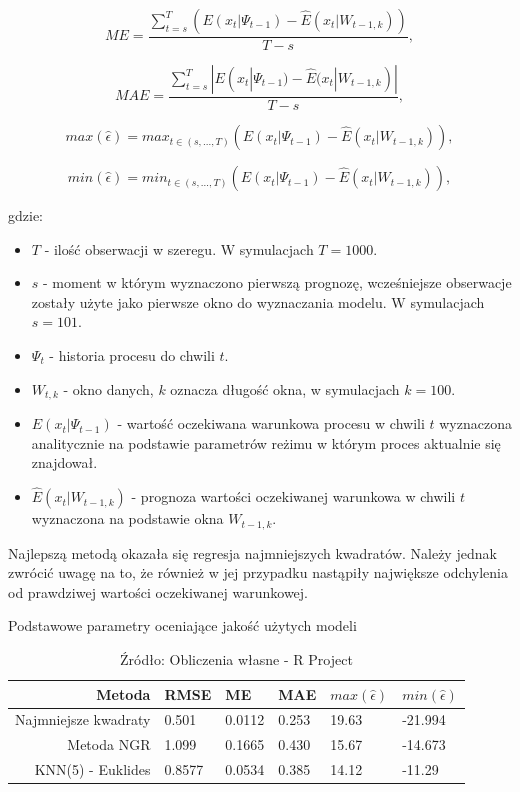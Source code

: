 \documentclass[man,mfu]{mgrwms}
\begin{document}
\begin{equation}
ME = \frac{\sum_{t=s}^{T}({E}(x_{t}|\Psi_{t-1})-\hat{E}(x_{t}|W_{t-1,k}))}{T-s},
\end{equation}

\begin{equation}
MAE = \frac{\sum_{t=s}^{T}|{E}(x_{t}|\Psi_{t-1})-\hat{E}(x_{t}|W_{t-1,k})|}{T-s},
\end{equation}

\begin{equation}
max(\hat{\epsilon}) = max_{t \in (s,...,T)}({E}(x_{t}|\Psi_{t-1})-\hat{E}(x_{t}|W_{t-1,k})),
\end{equation}

\begin{equation}
min(\hat{\epsilon}) = min_{t \in (s,...,T)}({E}(x_{t}|\Psi_{t-1})-\hat{E}(x_{t}|W_{t-1,k})),
\end{equation}

gdzie:

\begin{itemize}
\item $T$ - ilość obserwacji w szeregu. W symulacjach $T=1000$.
\item $s$ - moment w którym wyznaczono pierwszą prognozę, wcześniejsze obserwacje zostały użyte jako pierwsze okno do wyznaczania modelu. W symulacjach $s = 101$.
\item $\Psi_{t}$ - historia procesu do chwili $t$.
\item $W_{t,k}$ - okno danych, $k$ oznacza długość okna, w symulacjach $k=100$.
\item ${E}(x_{t}|\Psi_{t-1})$ - wartość oczekiwana warunkowa procesu w chwili $t$ wyznaczona analitycznie na podstawie parametrów reżimu w którym proces aktualnie się znajdował.
\item $\hat{E}(x_{t}|W_{t-1,k})$ - prognoza wartości oczekiwanej warunkowa w chwili $t$ wyznaczona na podstawie okna $W_{t-1,k}$.
\end{itemize}


Najlepszą metodą okazała się regresja najmniejszych kwadratów. Należy jednak zwrócić uwagę na to, że również w jej przypadku nastąpiły największe odchylenia od prawdziwej wartości oczekiwanej warunkowej. 

\begin{table}[H]
\caption{Podstawowe parametry oceniające jakość użytych modeli}
\label{restable}
\begin{tabular}{|r|l|l|l|l|l|}
  \hline
  Metoda & RMSE & ME & MAE & $max(\hat{\epsilon})$& $min(\hat{\epsilon})$ \\
  \hline 
  Najmniejsze kwadraty & 0.501 & 0.0112 & 0.253 & 19.63 & -21.994\\
  \hline
  Metoda NGR & 1.099 & 0.1665 & 0.430 & 15.67 & -14.673\\
  \hline
  KNN(5) - Euklides & 0.8577 & 0.0534 & 0.385 & 14.12 & -11.29\\
  \hline
  
\end{tabular}
\caption*{Źródło: Obliczenia własne - R Project}
\end{table}
\end{document}
